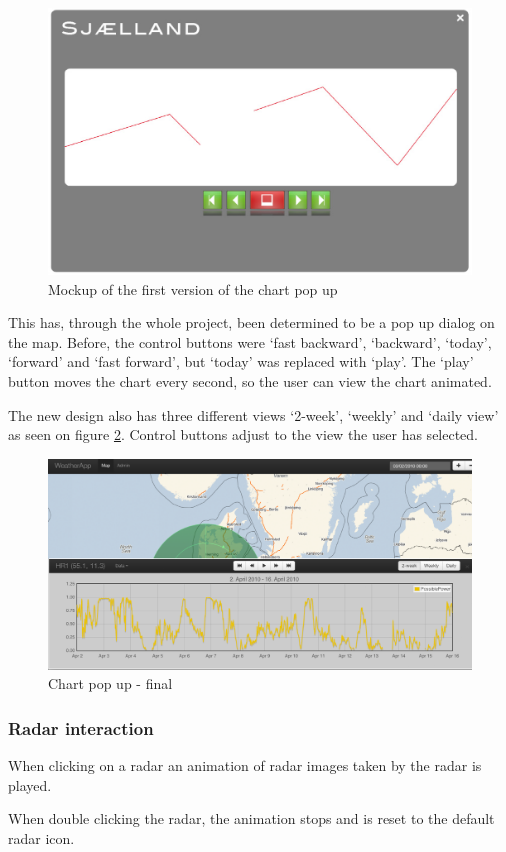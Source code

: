 \begin{figure}[htbp]
   \centering
   \includegraphics[width=1\linewidth]{figure/design_chart_v1.eps}
   \caption{Mockup of the first version of the chart pop up}
   \label{fig:chart_v1}
\end{figure}

This has, through the whole project, been determined to be a pop up dialog on the map.
Before, the control buttons were `fast backward', `backward', `today', `forward' and `fast forward', but `today' was replaced with `play'. The `play' button moves the chart every second, so the user can view the chart animated.

The new design also has three different views `2-week', `weekly' and `daily view' as seen on figure \ref{fig:chart_final}. Control buttons adjust to the view the user has selected.

\begin{figure}[htbp]
   \centering
   \includegraphics[width=1\linewidth]{figure/design_chart_final.eps}
   \caption{Chart pop up - final}
   \label{fig:chart_final}
\end{figure}

\subsubsection{Radar interaction}
\label{sec:radar_interaction}
When clicking on a radar an animation of radar images taken by the radar is played.

When double clicking the radar, the animation stops and is reset to the default radar icon.



